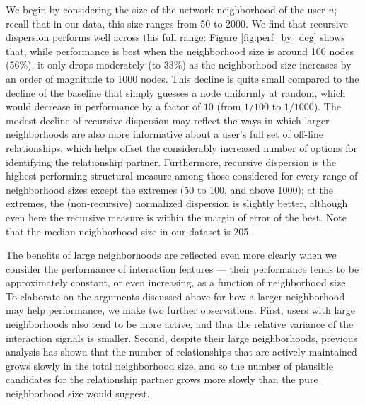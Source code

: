 \documentclass{sigchi}
\begin{document}
We begin by considering the size of the network neighborhood of
the user $u$;
recall that in our data, this size ranges from 50 to 2000.
We find that recursive dispersion performs well across this full range:
Figure \ref{fig:perf_by_deg} shows that, 
while performance is best when the neighborhood size is
around 100 nodes (56\%), it only drops moderately (to 33\%)
as the neighborhood size increases by an order of magnitude to 1000 nodes.
This decline is quite small compared to the decline of the
baseline that simply guesses a node uniformly at random, which would
decrease in performance by a factor of $10$ (from $1/100$ to $1/1000$).
The modest decline of recursive dispersion may reflect the ways
in which larger neighborhoods are also more informative about 
a user's full set of off-line relationships, which helps offset the
considerably increased number of options for identifying the
relationship partner.
Furthermore, recursive dispersion 
is the highest-performing structural measure among those considered 
for every range of neighborhood sizes except the extremes
(50 to 100, and above 1000); at the extremes, the (non-recursive)
normalized dispersion is slightly better, 
although even here
the recursive measure is within the margin of error of the best.
Note that the median neighborhood size in our dataset is 205.

The benefits of large neighborhoods are reflected even more clearly
when we consider the performance of interaction features --- their
performance tends to be approximately constant, or even increasing,
as a function of neighborhood size.
To elaborate on the arguments discussed above for how a larger
neighborhood may help performance, we make two further observations.
First, users with large neighborhoods also tend to be more
active, and thus the relative variance of the interaction signals is smaller.
Second, despite their large neighborhoods, 
previous analysis \cite{marlow-facebook-tie-strength-ext}
has shown that the number of relationships that are actively maintained
grows slowly in the total neighborhood size,
and so the number of plausible candidates for the relationship
partner grows more slowly than the pure neighborhood size would suggest.  
\end{document}
